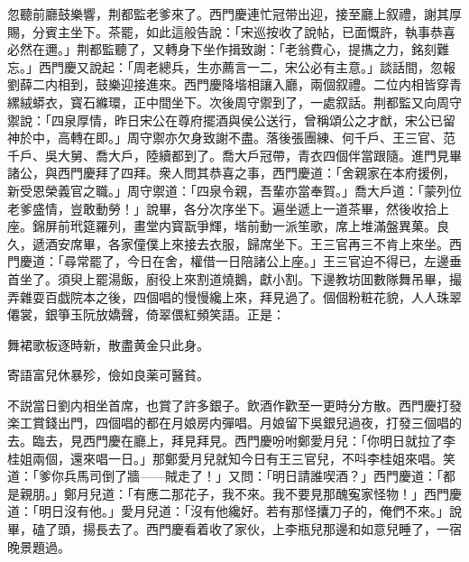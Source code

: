 忽聽前廳鼓樂響，荆都監老爹來了。西門慶連忙冠带出迎，接至廳上叙禮，謝其厚賜，分賓主坐下。茶罷，如此這般告說：「宋巡按收了說帖，已面慨許，執事恭喜必然在邇。」荆都監聽了，又轉身下坐作揖致謝：「老翁費心，提㩦之力，銘刻難忘。」西門慶又說起：「周老總兵，生亦薦言一二，宋公必有主意。」談話間，忽報劉薛二内相到，鼓樂迎接進來。西門慶降堦相讓入廳，兩個叙禮。二位内相皆穿青縲絨蟒衣，寳石縧環，正中間坐下。次後周守禦到了，一處叙話。荆都監又向周守禦說：「四泉厚情，昨日宋公在尊府擺酒與侯公送行，曾稱頌公之才猷，宋公已留神於中，高轉在即。」周守禦亦欠身致謝不盡。落後張團練、何千戶、王三官、范千戶、吳大舅、喬大戶，陸續都到了。喬大戶冠帶，青衣四個伴當跟隨。進門見畢諸公，與西門慶拜了四拜。衆人問其恭喜之事，西門慶道：「舍親家在本府援例，新受恩榮義官之職。」周守禦道：「四泉令親，吾輩亦當奉賀。」喬大戶道：「蒙列位老爹盛情，豈敢動勞！」說畢，各分次序坐下。遍坐遞上一道茶畢，然後收拾上座。錦屏前玳筵羅列，畫堂内寳翫爭輝，堦前動一派笙歌，席上堆滿盤異菓。良久，遞酒安席畢，各家僮僕上來接去衣服，歸席坐下。王三官再三不肯上來坐。西門慶道：「尋常罷了，今日在舍，權借一日陪諸公上座。」王三官迫不得已，左邊垂首坐了。須臾上罷湯飯，廚役上來割道燒鵝，獻小割。下邊教坊囬數隊舞吊畢，撮弄雜耍百戯院本之後，四個唱的慢慢纔上來，拜見過了。個個粉粧花貌，人人珠翠僊裳，銀箏玉阮放嬌聲，倚翠偎紅頻笑語。正是：

\begin{myquote}
舞裙歌板逐時新，散盡黄金只此身。

寄語富兒休暴殄，儉如良薬可醫貧。
\end{myquote}

不説當日劉内相坐首席，也賞了許多銀子。飲酒作歡至一更時分方散。西門慶打發楽工賞錢出門，四個唱的都在月娘房内彈唱。月娘留下吳銀兒過夜，打發三個唱的去。臨去，見西門慶在廳上，拜見拜見。西門慶吩咐鄭愛月兒：「你明日就拉了李桂姐兩個，還來唱一日。」那鄭愛月兒就知今日有王三官兒，不呌李桂姐來唱。笑道：「爹你兵馬司倒了牆——賊走了！」又問：「明日請誰喫酒？」西門慶道：「都是親朋。」鄭月兒道：「有應二那花子，我不來。我不要見那醜寃家怪物！」西門慶道：「明日沒有他。」愛月兒道：「沒有他纔好。若有那怪攮刀子的，俺們不來。」說畢，磕了頭，揚長去了。西門慶看着收了家伙，上李瓶兒那邊和如意兒睡了，一宿晚景題過。

